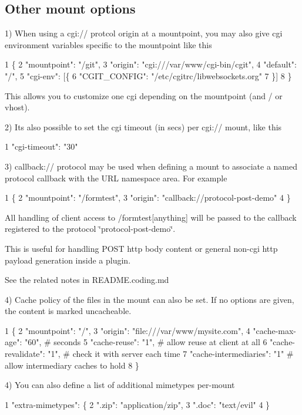 \subsection*{Other mount options }

1) When using a cgi\+:// protcol origin at a mountpoint, you may also give cgi environment variables specific to the mountpoint like this 
\begin{DoxyCode}
1 \{
2  "mountpoint": "/git",
3  "origin": "cgi:///var/www/cgi-bin/cgit",
4  "default": "/",
5  "cgi-env": [\{
6          "CGIT\_CONFIG": "/etc/cgitrc/libwebsockets.org"
7  \}]
8 \}
\end{DoxyCode}
 This allows you to customize one cgi depending on the mountpoint (and / or vhost).

2) It\textquotesingle{}s also possible to set the cgi timeout (in secs) per cgi\+:// mount, like this 
\begin{DoxyCode}
1 "cgi-timeout": "30"
\end{DoxyCode}
 3) {\ttfamily callback\+://} protocol may be used when defining a mount to associate a named protocol callback with the U\+RL namespace area. For example 
\begin{DoxyCode}
1 \{
2  "mountpoint": "/formtest",
3  "origin": "callback://protocol-post-demo"
4 \}
\end{DoxyCode}
 All handling of client access to /formtest\mbox{[}anything\mbox{]} will be passed to the callback registered to the protocol \char`\"{}protocol-\/post-\/demo\char`\"{}.

This is useful for handling P\+O\+ST http body content or general non-\/cgi http payload generation inside a plugin.

See the related notes in R\+E\+A\+D\+M\+E.\+coding.\+md

4) Cache policy of the files in the mount can also be set. If no options are given, the content is marked uncacheable. 
\begin{DoxyCode}
1 \{
2  "mountpoint": "/",
3  "origin": "file:///var/www/mysite.com",
4  "cache-max-age": "60",      # seconds
5  "cache-reuse": "1",         # allow reuse at client at all
6  "cache-revalidate": "1",    # check it with server each time
7  "cache-intermediaries": "1" # allow intermediary caches to hold
8 \}
\end{DoxyCode}


4) You can also define a list of additional mimetypes per-\/mount 
\begin{DoxyCode}
1 "extra-mimetypes": \{
2          ".zip": "application/zip",
3          ".doc": "text/evil"
4  \}
\end{DoxyCode}



